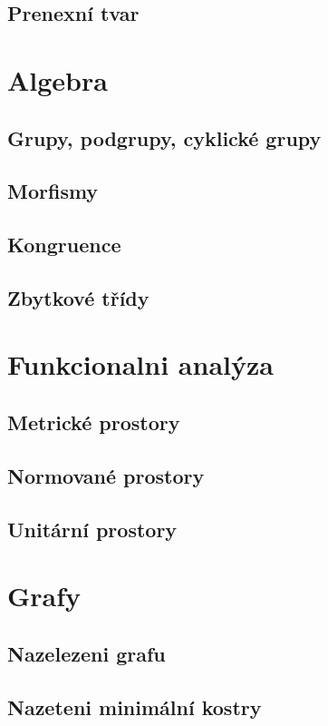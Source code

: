 \documentclass[12pt,a4paper,notitlepage,final]{article}
\begin{document}
\subsection{Prenexní tvar}                  

\section{Algebra}
\subsection{Grupy, podgrupy, cyklické grupy}  
\subsection{Morfismy}                         
\subsection{Kongruence}                       
\subsection{Zbytkové třídy}                   

\section{Funkcionalni analýza}
\subsection{Metrické prostory}  
\subsection{Normované prostory} 
\subsection{Unitární prostory}  

\section{Grafy}
\subsection{Nazelezeni grafu}           
\subsection{Nazeteni minimální kostry}  
\end{document}
